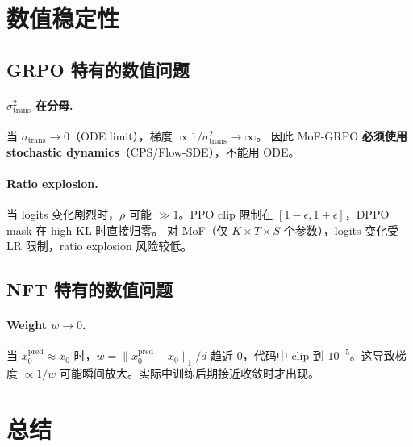 \documentclass[11pt,a4paper]{article}
\theoremstyle{definition}
\begin{document}
\section{数值稳定性}
\label{sec:stability}

\subsection{GRPO 特有的数值问题}

\paragraph{$\sigma_{\mathrm{trans}}^2$ 在分母.}
当 $\sigma_{\mathrm{trans}} \to 0$（ODE limit），梯度 $\propto 1/\sigma_{\mathrm{trans}}^2 \to \infty$。
因此 MoF-GRPO \textbf{必须使用 stochastic dynamics}（CPS/Flow-SDE），不能用 ODE。

\paragraph{Ratio explosion.}
当 logits 变化剧烈时，$\rho$ 可能 $\gg 1$。PPO clip 限制在 $[1-\epsilon, 1+\epsilon]$，DPPO mask 在 high-KL 时直接归零。
对 MoF（仅 $K \times T \times S$ 个参数），logits 变化受 LR 限制，ratio explosion 风险较低。

\subsection{NFT 特有的数值问题}

\paragraph{Weight $w \to 0$.}
当 $x_0^{\mathrm{pred}} \approx x_0$ 时，$w = \|x_0^{\mathrm{pred}} - x_0\|_1/d$ 趋近 0，代码中 clip 到 $10^{-5}$。这导致梯度 $\propto 1/w$ 可能瞬间放大。实际中训练后期接近收敛时才出现。

\section{总结}
\label{sec:summary}
\end{document}
